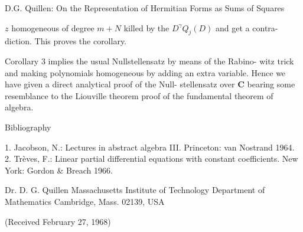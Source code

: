  D.G. Quillen: On the Representation of Hermitian Forms as Sums of Squares

$z$ homogeneous of degree $m+N$ killed by the $D^\gamma Q_j(D)$ and get a contra-%
diction. This proves the corollary.

Corollary 3 implies the usual Nullstellensatz by means of the Rabino-%
witz trick and making polynomials homogeneous by adding an extra
variable. Hence we have given a direct analytical proof of the Null-%
stellensatz over $\mathbf{C}$ bearing some resemblance to the Liouville theorem
proof of the fundamental theorem of algebra.

Bibliography

1. Jacobson, N.: Lectures in abstract algebra III. Princeton: van Nostrand 1964.
2. Trèves, F.: Linear partial differential equations with constant coefficients. New York:
Gordon \& Breach 1966.

Dr. D. G. Quillen
Massachusetts Institute of Technology
Department of Mathematics
Cambridge, Mass. 02139, USA

(Received February 27, 1968)

